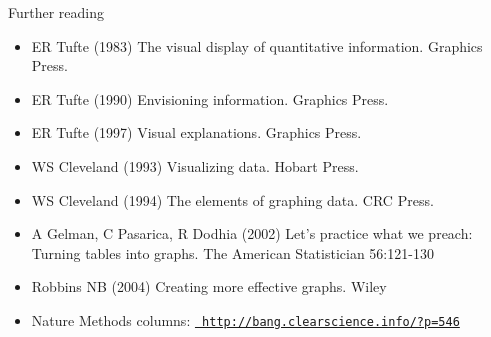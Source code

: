 \documentclass[12pt]{article}
\newcommand{\headsize}{\fontsize{35}{35} \selectfont}
\newcommand{\smallestsize}{\fontsize{18}{22} \selectfont}
\begin{document}
\newpage


\headsize \color{yellow}
\hfill \begin{minipage}{5.75in}
\centering
Further reading
\end{minipage}

\vspace{30mm}
\smallestsize \color{white}

\hspace{0.5in} \begin{minipage}[t]{9in}
\begin{itemize}

\itemsep12pt

\item ER Tufte (1983) The visual display of quantitative information.
Graphics Press.
\item ER Tufte (1990) Envisioning information. Graphics Press.
\item ER Tufte (1997) Visual explanations. Graphics Press.

\vspace*{8mm}

\item WS Cleveland (1993) Visualizing data. Hobart Press.
\item WS Cleveland (1994) The elements of graphing data. CRC Press.

\vspace*{8mm}

\item A Gelman, C Pasarica, R Dodhia (2002) Let's practice what we preach:
Turning tables into graphs. The American Statistician 56:121-130

\vspace*{8mm}

\item Robbins NB (2004) Creating more effective graphs. Wiley

\vspace*{8mm}

\item Nature Methods columns: \href{http://bang.clearscience.info/?p=546}{\tt \color{blue} http://bang.clearscience.info/?p=546}

\end{itemize}
\end{minipage}
\end{document}
